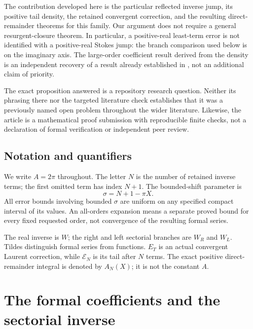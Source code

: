 \documentclass[11pt,a4paper]{article}
\theoremstyle{definition}
\numberwithin{equation}{section}
\newcommand{\ctail}{\mathcal E}
\begin{document}
The contribution developed here is the particular reflected inverse
jump, its positive tail density, the retained convergent correction, and
the resulting direct-remainder theorems for this family. Our argument does
not require a general resurgent-closure theorem. In particular, a
positive-real least-term error is not identified with a positive-real
Stokes jump: the branch comparison used below is on the imaginary axis.
The large-order coefficient result derived from the density is an
independent recovery of a result already established in \cite{prior}, not
an additional claim of priority.

The exact proposition answered is a repository research question. Neither
its phrasing there nor the targeted literature check establishes that it
was a previously named open problem throughout the wider literature.
Likewise, the article is a mathematical proof submission with reproducible
finite checks, not a declaration of formal verification or independent
peer review.

\subsection{Notation and quantifiers}
We write $A=2\pi$ throughout. The letter $N$ is the number of retained
inverse terms; the first omitted term has index $N+1$. The bounded-shift
parameter is
\begin{equation}
 \sigma=N+1-\pi X.
 \label{eq:sigma}
\end{equation}
All error bounds involving bounded $\sigma$ are uniform on any specified
compact interval of its values. An all-orders expansion means a separate
proved bound for every fixed requested order, not convergence of the
resulting formal series.

The real inverse is $W$; the right and left sectorial branches are $W_R$
and $W_L$. Tildes distinguish formal series from functions.
$E_T$ is an actual convergent Laurent correction, while
$\ctail_N$ is its tail after $N$ terms. The exact positive direct-remainder
integral is denoted by $A_N(X)$; it is not the constant $A$.

\section{The formal coefficients and the sectorial inverse}
\label{sec:inverse}
\end{document}
